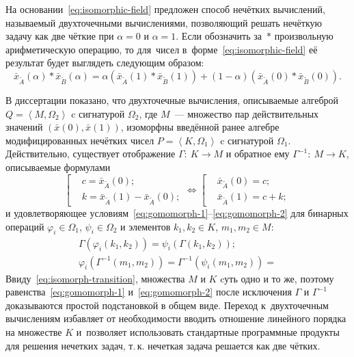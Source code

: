 На основании~\eqref{eq:isomorphic-field} предложен способ нечётких вычислений, называемый двухточечными вычислениями, позволяющий решать нечёткую задачу как две чёткие при $\alpha=0$ и $\alpha=1$. Если обозначить за~$*$ произвольную арифметическую операцию, то для~чисел в~форме~\eqref{eq:isomorphic-field} её результат будет выглядеть следующим образом:
\begin{equation}
\label{eq:two-point-calculations}
  \bar{x}_{\tilde A}\left( \alpha \right)*\bar{x}_{\tilde B}\left(\alpha \right)=\alpha \left(\bar{x}_{\tilde A}\left( 1 \right)*\bar{x}_{\tilde B}\left(1 \right) \right)+\left(1-\alpha \right)\left(\bar{x}_{\tilde A}\left(0 \right)*\bar{x}_{\tilde B}\left(0 \right) \right).
\end{equation}

В диссертации показано, что двухточечные вычисления, описываемые алгеброй $Q=\left\langle M, \Omega_2 \right\rangle$ c сигнатурой $\Omega_2$, где $M$~--- множество пар действительных значений $\left(\bar x\left(0\right), \bar x \left(1\right) \right)$,   изоморфны введённой ранее алгебре модифицированных нечётких чисел $P=\left\langle K, \Omega_1 \right\rangle$ c сигнатурой $\Omega_1$. Действительно, существует отображение $\Gamma:\ K \to M$ и обратное ему $\Gamma^{-1}:\ M \to K$, описываемые формулами 
\begin{equation}
  \label{eq:isomorph-transition}
  \left[ \begin{aligned}
    & c=\bar{x}_{\tilde A}\left( 0 \right); \\ 
    & k=\bar{x}_{\tilde A}\left( 1 \right)-\bar{x}_{\tilde A}\left( 0 \right);
  \end{aligned} \right.
  \Leftrightarrow 
  \left[ \begin{aligned}
    & \bar{x}_{\tilde A}\left( 0 \right)=c; \\ 
    & \bar{x}_{\tilde A}\left( 1 \right)=c+k;
  \end{aligned} \right.
\end{equation}
и удовлетворяющее условиям~\eqref{eq:gomomorph-1}--\eqref{eq:gomomorph-2} для бинарных операций $\varphi_i \in \Omega_1$, $\psi_i \in \Omega_2$ и элементов $k_1, k_2 \in K$, $m_1, m_2 \in M$:
\begin{gather}
  \label{eq:gomomorph-1}
  \Gamma\left( \varphi_i \left( k_1, k_2 \right) \right) = \psi_i\left( \Gamma \left(k_1, k_2 \right) \right); \\
  \label{eq:gomomorph-2}
  \varphi_i\left( \Gamma^{-1} \left(m_1, m_2 \right) \right) = \Gamma^{-1}\left( \psi_i \left(m_1, m_2 \right) \right) = 
\end{gather}
Ввиду~\eqref{eq:isomorph-transition}, множества $M$ и $K$ cуть одно и то же, поэтому равенства~\eqref{eq:gomomorph-1} и~\eqref{eq:gomomorph-2} после исключения $\Gamma$ и $\Gamma^{-1}$ доказываются простой подстановкой в общем виде. Переход к~двухточечным вычислениям избавляет от необходимости вводить отношение линейного порядка на множестве $K$ и~позволяет использовать стандартные программные продукты для решения нечетких задач, т.\,к. нечеткая задача решается как две чётких.

